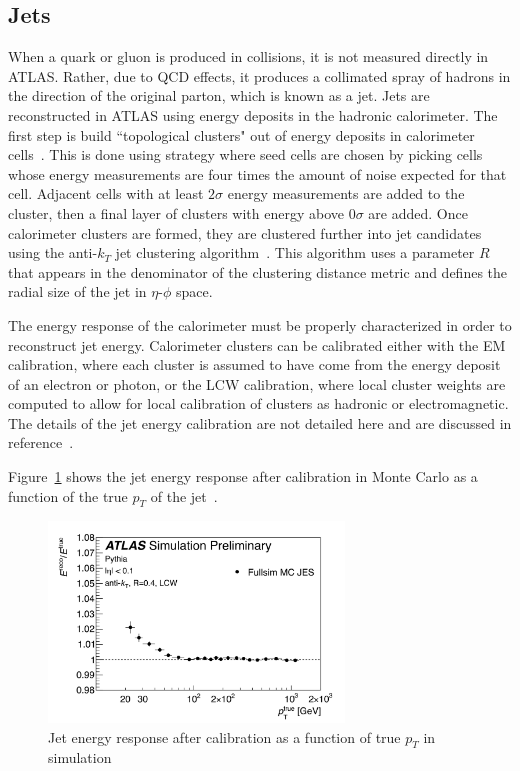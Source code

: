 \subsection{Jets}

When a quark or gluon is produced in collisions, it is not measured directly in ATLAS. Rather, due to QCD effects, it produces a collimated spray of hadrons in the direction of the original parton, which is known as a jet. Jets are reconstructed in ATLAS using energy deposits in the hadronic calorimeter. The first step is build ``topological clusters" out of energy deposits in calorimeter cells~\cite{TopoClusters,TopoClusters2}. This is done using strategy where seed cells are chosen by picking cells whose energy measurements are four times the amount of noise expected for that cell. Adjacent cells with at least $2\sigma$ energy measurements are added to the cluster, then a final layer of clusters with energy above $0\sigma$ are added. Once calorimeter clusters are formed, they are clustered further into jet candidates using the anti-$k_T$ jet clustering algorithm~\cite{AntiKt}. This algorithm uses a parameter $R$ that appears in the denominator of the clustering distance metric and defines the radial size of the jet in $\eta$-$\phi$ space. 

The energy response of the calorimeter must be properly characterized in order to reconstruct jet energy. Calorimeter clusters can be calibrated either with the EM calibration, where each cluster is assumed to have come from the energy deposit of an electron or photon, or the LCW calibration, where local cluster weights are computed to allow for local calibration of clusters as hadronic or electromagnetic. The details of the jet energy calibration are not detailed here and are discussed in reference~\cite{JetCalib}.

Figure~\ref{fig:jets} shows the jet energy response after calibration in Monte Carlo as a function of the true $p_{T}$ of the jet~\cite{JetCalib}.

\begin{figure}[h!]
  \centering
  \captionsetup{justification=centering}

  \includegraphics[width=0.7\textwidth]{figures/JetReso}
   \caption{Jet energy response after calibration as a function of true $p_{T}$ in simulation~\cite{JetCalib}}
  \label{fig:jets}
\end{figure}


